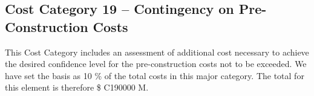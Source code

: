 \subsection*{Cost Category 19 – Contingency on Pre-Construction Costs}  
This Cost Category includes an assessment of additional cost necessary to achieve the desired confidence level for the pre-construction costs not
to be exceeded. We have set the basis as 10 \% of the total costs in this major category. The total for this element is therefore \$ C190000 M.




